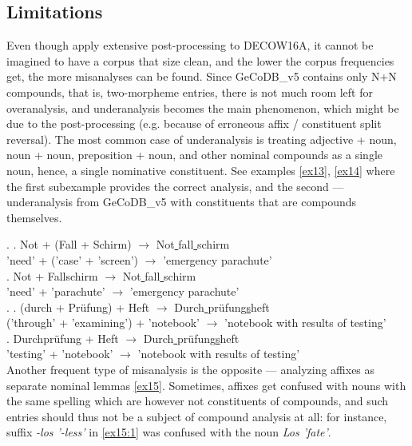 \documentclass[11pt]{article}
\begin{document}
\subsection{Limitations}

Even though \citet{SchaferBildhauer_in_prep} apply extensive post-processing to DECOW16A, it cannot be imagined to have a corpus that size clean, and the lower the corpus frequencies get, the more misanalyses can be found. Since GeCoDB\_v5 contains only N+N compounds, that is, two-morpheme entries, there is not much room left for overanalysis, and underanalysis becomes the main phenomenon, which might be due to the post-processing (e.g. because of erroneous affix / constituent split reversal). The most common case of underanalysis is treating adjective + noun, noun + noun, preposition + noun, and other nominal compounds as a single noun, hence, a single nominative constituent. See examples \ref{ex13}, \ref{ex14} where the first subexample provides the correct analysis, and the second --- underanalysis from GeCoDB\_v5 with constituents that are compounds themselves.

\ex. \label{ex13}
\ag. Not + (Fall + Schirm) {$\rightarrow$} Not\underline{ }fall\underline{ }schirm \\
'need' + ('case' + 'screen') {$\rightarrow$} {'emergency parachute'} \\
\bg. Not + Fallschirm {$\rightarrow$} Not\underline{ }fall\underline{ }schirm \\
'need' + 'parachute' {$\rightarrow$} {'emergency parachute'} \\

\ex. \label{ex14}
\ag. (durch + Pr{\"u}fung) + Heft {$\rightarrow$} Durch\underline{ }pr{\"u}fung\underline{s}heft \\
('through' + 'examining') + 'notebook' {$\rightarrow$} {'notebook with results of testing'} \\
\bg. Durchpr{\"u}fung + Heft {$\rightarrow$} Durch\underline{ }pr{\"u}fung\underline{s}heft \\
'testing' + 'notebook' {$\rightarrow$} {'notebook with results of testing'} \\


Another frequent type of misanalysis is the opposite --- analyzing affixes as separate nominal lemmas \ref{ex15}. Sometimes, affixes get confused with nouns with the same spelling which are however not constituents of compounds, and such entries should thus not be a subject of compound analysis at all: for instance, suffix \textit{-los '-less'} in \ref{ex15:1} was confused with the noun \textit{Los 'fate'}.
\end{document}
